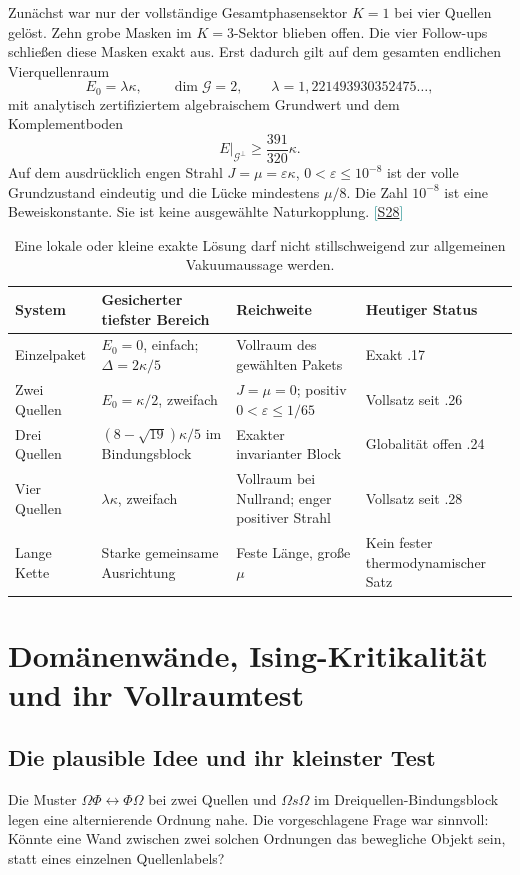 \documentclass[11pt,a4paper,oneside,parskip=half,headings=normal,numbers=noenddot,bibliography=totoc]{scrreprt}
\newcommand{\src}[1]{\textcolor{teal}{\small[\hyperref[s:#1]{S#1}]}}
\begin{document}
Zunächst war nur der vollständige Gesamtphasensektor $K=1$ bei vier Quellen gelöst. Zehn grobe Masken im $K=3$-Sektor blieben offen. Die vier Follow-ups schließen diese Masken exakt aus. Erst dadurch gilt auf dem gesamten endlichen Vierquellenraum
\[
 E_0=\lambda\kappa,\qquad\dim\mathcal G=2,\qquad
 \lambda=1{,}221493930352475\ldots,
\]
mit analytisch zertifiziertem algebraischem Grundwert und dem Komplementboden
\[
 E\big|_{\mathcal G^\perp}\ge\frac{391}{320}\kappa.
\]
Auf dem ausdrücklich engen Strahl $J=\mu=\varepsilon\kappa$, $0<\varepsilon\le10^{-8}$ ist der volle Grundzustand eindeutig und die Lücke mindestens $\mu/8$. Die Zahl $10^{-8}$ ist eine Beweiskonstante. Sie ist keine ausgewählte Naturkopplung. \src{28}

\begin{table}[ht]
\centering\small
\begin{tabularx}{\textwidth}{@{}lYYY@{}}
\toprule
System & Gesicherter tiefster Bereich & Reichweite & Heutiger Status\\\midrule
Einzelpaket & $E_0=0$, einfach; $\Delta=2\kappa/5$ & Vollraum des gewählten Pakets & Exakt .17\\
Zwei Quellen & $E_0=\kappa/2$, zweifach & $J=\mu=0$; positiv $0<\varepsilon\le1/65$ & Vollsatz seit .26\\
Drei Quellen & $(8-\sqrt{19})\kappa/5$ im Bindungsblock & Exakter invarianter Block & Globalität offen .24\\
Vier Quellen & $\lambda\kappa$, zweifach & Vollraum bei Nullrand; enger positiver Strahl & Vollsatz seit .28\\
Lange Kette & Starke gemeinsame Ausrichtung & Feste Länge, große $\mu$ & Kein fester thermodynamischer Satz\\\bottomrule
\end{tabularx}
\caption{Eine lokale oder kleine exakte Lösung darf nicht stillschweigend zur allgemeinen Vakuumaussage werden.}
\end{table}

\chapter{Domänenwände, Ising-Kritikalität und ihr Vollraumtest}
\section{Die plausible Idee und ihr kleinster Test}
Die Muster $\Omega\Phi\leftrightarrow\Phi\Omega$ bei zwei Quellen und $\Omega s\Omega$ im Dreiquellen-Bindungsblock legen eine alternierende Ordnung nahe. Die vorgeschlagene Frage war sinnvoll: Könnte eine Wand zwischen zwei solchen Ordnungen das bewegliche Objekt sein, statt eines einzelnen Quellenlabels?
\end{document}
